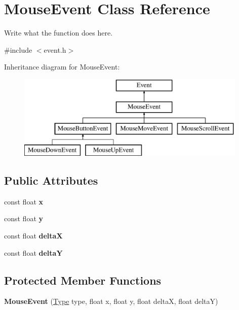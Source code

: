 \hypertarget{classMouseEvent}{\section{Mouse\+Event Class Reference}
\label{classMouseEvent}
}


Write what the function does here.  




{\ttfamily \#include $<$event.\+h$>$}

Inheritance diagram for Mouse\+Event\+:\begin{figure}[H]
\begin{center}
\leavevmode
\includegraphics[height=4.000000cm]{classMouseEvent}
\end{center}
\end{figure}
\subsection*{Public Attributes}
\begin{DoxyCompactItemize}
\item 
\hypertarget{classMouseEvent_a32d72e73b9a01bac66b70c249939e8bd}{const float {\bfseries x}}\label{classMouseEvent_a32d72e73b9a01bac66b70c249939e8bd}

\item 
\hypertarget{classMouseEvent_a1153ae91317c28fbed841dda37f98ff1}{const float {\bfseries y}}\label{classMouseEvent_a1153ae91317c28fbed841dda37f98ff1}

\item 
\hypertarget{classMouseEvent_aadd4befdf86a50c7b13fb2e8d90f370c}{const float {\bfseries delta\+X}}\label{classMouseEvent_aadd4befdf86a50c7b13fb2e8d90f370c}

\item 
\hypertarget{classMouseEvent_a2a94fbca0cc7587701ead66279e87b47}{const float {\bfseries delta\+Y}}\label{classMouseEvent_a2a94fbca0cc7587701ead66279e87b47}

\end{DoxyCompactItemize}
\subsection*{Protected Member Functions}
\begin{DoxyCompactItemize}
\item 
\hypertarget{classMouseEvent_a38e3202976fe08a74713bbb3326004c6}{{\bfseries Mouse\+Event} (\hyperlink{classEvent_a2abf13b5be49315e9e362af02029f058}{Type} type, float x, float y, float delta\+X, float delta\+Y)}\label{classMouseEvent_a38e3202976fe08a74713bbb3326004c6}

\end{DoxyCompactItemize}
